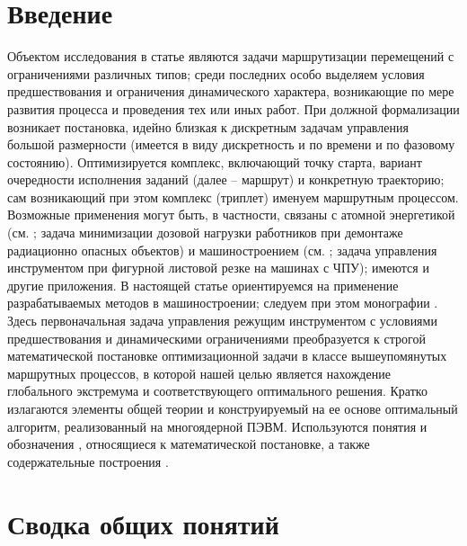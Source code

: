 \documentclass[10pt]{SPIIRAS_Proceedings}
\begin{document}
\maketitle

\normalsize

\section*{Введение}
\label{sec:intro}

Объектом исследования в статье
являются задачи маршрутизации перемещений
с ограничениями различных типов;
среди последних особо выделяем условия
предшествования и ограничения динамического характера,
возникающие по мере развития процесса и проведения тех или иных работ.
При должной формализации возникает постановка,
идейно близкая к дискретным задачам управления большой размерности
(имеется в виду дискретность и по времени и  по фазовому состоянию).
Оптимизируется комплекс, включающий точку старта,
вариант очередности исполнения заданий
(далее -- маршрут)
и конкретную траекторию;
сам возникающий при этом комплекс (триплет)
именуем маршрутным процессом.
Возможные применения могут быть,
в частности, связаны с атомной энергетикой
(см. \cite{1,2,3};
задача минимизации дозовой нагрузки работников при демонтаже радиационно опасных объектов)
и машиностроением (см. \cite{4,5,6};
задача управления инструментом при фигурной листовой резке на машинах с ЧПУ);
имеются и другие приложения.
В настоящей статье ориентируемся на применение разрабатываемых методов в машиностроении;
следуем при этом монографии \cite{4}.
Здесь первоначальная задача управления режущим инструментом
с условиями предшествования и динамическими ограничениями
преобразуется к строгой математической постановке
оптимизационной задачи в классе вышеупомянутых маршрутных процессов,
в которой нашей целью является нахождение
глобального экстремума и соответствующего оптимального решения.
Кратко излагаются элементы общей теории и
конструируемый на ее основе оптимальный алгоритм,
реализованный на многоядерной ПЭВМ.
Используются понятия и обозначения
\cite[часть II]{4},
относящиеся к математической постановке,
а также содержательные построения \cite[часть I]{4}.

\section{Сводка общих понятий}
\label{sec:1}
\end{document}

